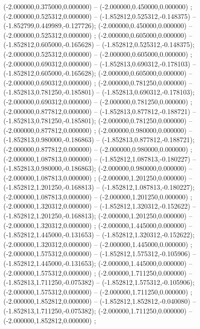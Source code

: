  (-2.000000,0.375000,0.000000) -- (-2.000000,0.450000,0.000000) ;
 (-2.000000,0.525312,0.000000) -- (-1.852812,0.525312,-0.148375) -- (-1.852799,0.449989,-0.127726);
 (-2.000000,0.450000,0.000000) -- (-2.000000,0.525312,0.000000) ;
 (-2.000000,0.605000,0.000000) -- (-1.852812,0.605000,-0.165628) -- (-1.852812,0.525312,-0.148375);
 (-2.000000,0.525312,0.000000) -- (-2.000000,0.605000,0.000000) ;
 (-2.000000,0.690312,0.000000) -- (-1.852813,0.690312,-0.178103) -- (-1.852812,0.605000,-0.165628);
 (-2.000000,0.605000,0.000000) -- (-2.000000,0.690312,0.000000) ;
 (-2.000000,0.781250,0.000000) -- (-1.852813,0.781250,-0.185801) -- (-1.852813,0.690312,-0.178103);
 (-2.000000,0.690312,0.000000) -- (-2.000000,0.781250,0.000000) ;
 (-2.000000,0.877812,0.000000) -- (-1.852813,0.877812,-0.188721) -- (-1.852813,0.781250,-0.185801);
 (-2.000000,0.781250,0.000000) -- (-2.000000,0.877812,0.000000) ;
 (-2.000000,0.980000,0.000000) -- (-1.852813,0.980000,-0.186863) -- (-1.852813,0.877812,-0.188721);
 (-2.000000,0.877812,0.000000) -- (-2.000000,0.980000,0.000000) ;
 (-2.000000,1.087813,0.000000) -- (-1.852812,1.087813,-0.180227) -- (-1.852813,0.980000,-0.186863);
 (-2.000000,0.980000,0.000000) -- (-2.000000,1.087813,0.000000) ;
 (-2.000000,1.201250,0.000000) -- (-1.852812,1.201250,-0.168813) -- (-1.852812,1.087813,-0.180227);
 (-2.000000,1.087813,0.000000) -- (-2.000000,1.201250,0.000000) ;
 (-2.000000,1.320312,0.000000) -- (-1.852812,1.320312,-0.152622) -- (-1.852812,1.201250,-0.168813);
 (-2.000000,1.201250,0.000000) -- (-2.000000,1.320312,0.000000) ;
 (-2.000000,1.445000,0.000000) -- (-1.852812,1.445000,-0.131653) -- (-1.852812,1.320312,-0.152622);
 (-2.000000,1.320312,0.000000) -- (-2.000000,1.445000,0.000000) ;
 (-2.000000,1.575312,0.000000) -- (-1.852812,1.575312,-0.105906) -- (-1.852812,1.445000,-0.131653);
 (-2.000000,1.445000,0.000000) -- (-2.000000,1.575312,0.000000) ;
 (-2.000000,1.711250,0.000000) -- (-1.852813,1.711250,-0.075382) -- (-1.852812,1.575312,-0.105906);
 (-2.000000,1.575312,0.000000) -- (-2.000000,1.711250,0.000000) ;
 (-2.000000,1.852812,0.000000) -- (-1.852812,1.852812,-0.040080) -- (-1.852813,1.711250,-0.075382);
 (-2.000000,1.711250,0.000000) -- (-2.000000,1.852812,0.000000) ;
